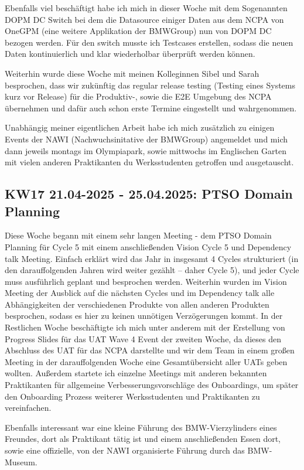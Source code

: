 Ebenfalls viel beschäftigt habe ich mich in dieser Woche mit dem Sogenannten \ac{DOPM DC} Switch bei dem die Datasource einiger Daten aus dem \ac{NCPA} von \ac{OneGPM} (eine weitere Applikation der BMWGroup) nun von \ac{DOPM DC} bezogen werden. 
Für den switch musste ich Testcases erstellen, sodass die neuen Daten kontinuierlich und klar wiederholbar überprüft werden können.

Weiterhin wurde diese Woche mit meinen Kolleginnen Sibel und Sarah besprochen, dass wir zukünftig das regular release testing (Testing eines Systems kurz vor Release) für die Produktiv-, sowie die \ac{E2E} Umgebung des \ac{NCPA} übernehmen und dafür auch schon erste Termine eingestellt und wahrgenommen.

Unabhängig meiner eigentlichen Arbeit habe ich mich zusätzlich zu einigen Events der \ac{NAWI} (Nachwuchsinitative der BMWGroup) angemeldet und mich dann jeweils montags im Olympiapark, sowie mittwochs im Englischen Garten mit vielen anderen Praktikanten du Werksstudenten getroffen und ausgetauscht.


\subsection{KW17 21.04-2025 - 25.04.2025: PTSO Domain Planning}
Diese Woche begann mit einem sehr langen Meeting - dem PTSO Domain Planning für Cycle 5 mit einem anschließenden Vision Cycle 5 und Dependency talk Meeting. 
Einfach erklärt wird das Jahr in insgesamt 4 Cycles strukturiert (in den darauffolgenden Jahren wird weiter gezählt – daher Cycle 5), und jeder Cycle muss ausführlich geplant und besprochen werden. 
Weiterhin wurden im Vision Meeting der Ausblick auf die nächsten Cycles und im Dependency talk alle Abhängigkeiten der verschiedenen Produkte von allen anderen Produkten besprochen, sodass es hier zu keinen unnötigen Verzögerungen kommt. 
In der Restlichen Woche beschäftigte ich mich unter anderem mit der Erstellung von Progress Slides für das \ac{UAT} Wave 4 Event der zweiten Woche, da dieses den Abschluss des \ac{UAT} für das \ac{NCPA} darstellte und wir dem Team in einem großen Meeting in der darauffolgenden Woche eine Gesamtübersicht aller \acp{UAT} geben wollten. 
Außerdem startete ich einzelne Meetings mit anderen bekannten Praktikanten für allgemeine Verbesserungsvorschläge des Onboardings, um später den Onboarding Prozess weiterer Werksstudenten und Praktikanten zu vereinfachen.

Ebenfalls interessant war eine kleine Führung des BMW-Vierzylinders eines Freundes, dort als Praktikant tätig ist und einem anschließenden Essen dort, sowie eine offizielle, von der \ac{NAWI} organisierte Führung durch das BMW-Museum.

